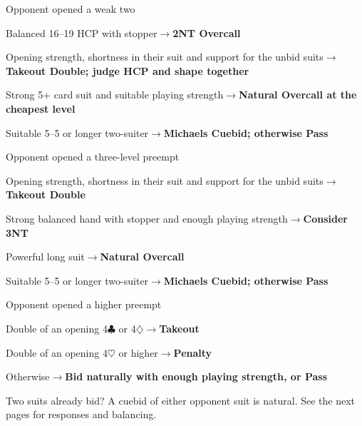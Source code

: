 \documentclass[10pt,letterpaper]{article}
\newcommand{\C}{\ensuremath{\clubsuit}}
\newcommand{\D}{\ensuremath{\diamondsuit}}
\newcommand{\Hh}{\ensuremath{\heartsuit}}
\begin{document}
\begin{minipage}[t]{0.485\textwidth}\vspace{0pt}

\begin{guidecard}{Opponent opened a weak two}
\begin{branches}
\item Balanced 16--19 HCP with stopper\;\ensuremath{\longrightarrow}\;\textbf{2NT Overcall}
\item Opening strength, shortness in their suit and support for the unbid suits\;\ensuremath{\longrightarrow}\;\textbf{Takeout Double; judge HCP and shape together}
\item Strong 5+ card suit and suitable playing strength\;\ensuremath{\longrightarrow}\;\textbf{Natural Overcall at the cheapest level}
\item Suitable 5--5 or longer two-suiter\;\ensuremath{\longrightarrow}\;\textbf{Michaels Cuebid; otherwise Pass}
\end{branches}
\end{guidecard}

\begin{guidecard}{Opponent opened a three-level preempt}
\begin{branches}
\item Opening strength, shortness in their suit and support for the unbid suits\;\ensuremath{\longrightarrow}\;\textbf{Takeout Double}
\item Strong balanced hand with stopper and enough playing strength\;\ensuremath{\longrightarrow}\;\textbf{Consider 3NT}
\item Powerful long suit\;\ensuremath{\longrightarrow}\;\textbf{Natural Overcall}
\item Suitable 5--5 or longer two-suiter\;\ensuremath{\longrightarrow}\;\textbf{Michaels Cuebid; otherwise Pass}
\end{branches}
\end{guidecard}

\begin{guidecard}{Opponent opened a higher preempt}
\begin{branches}
\item Double of an opening 4\C{} or 4\D{}\;\ensuremath{\longrightarrow}\;\textbf{Takeout}
\item Double of an opening 4\Hh{} or higher\;\ensuremath{\longrightarrow}\;\textbf{Penalty}
\item Otherwise\;\ensuremath{\longrightarrow}\;\textbf{Bid naturally with enough playing strength, or Pass}
\end{branches}
\end{guidecard}

\begin{guidecard}{Two suits already bid?}
A cuebid of either opponent suit is natural. See the next pages for responses and balancing.
\end{guidecard}

\end{minipage}
\end{document}
